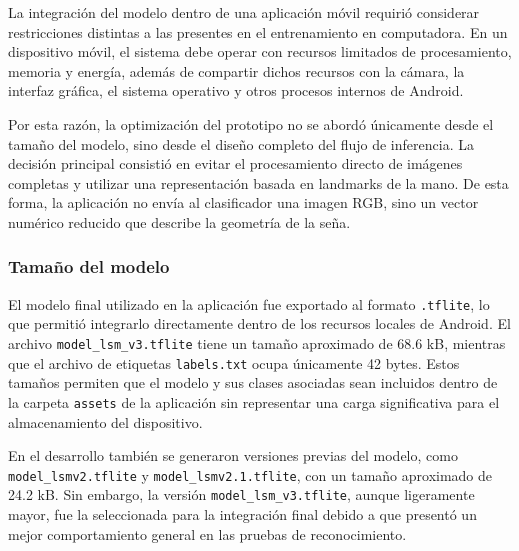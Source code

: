 	La integración del modelo dentro de una aplicación móvil requirió considerar restricciones distintas a las presentes en el entrenamiento en computadora. En un dispositivo móvil, el sistema debe operar con recursos limitados de procesamiento, memoria y energía, además de compartir dichos recursos con la cámara, la interfaz gráfica, el sistema operativo y otros procesos internos de Android.
	
	Por esta razón, la optimización del prototipo no se abordó únicamente desde el tamaño del modelo, sino desde el diseño completo del flujo de inferencia. La decisión principal consistió en evitar el procesamiento directo de imágenes completas y utilizar una representación basada en landmarks de la mano. De esta forma, la aplicación no envía al clasificador una imagen RGB, sino un vector numérico reducido que describe la geometría de la seña.
	
	\subsubsection{Tamaño del modelo}
	
	El modelo final utilizado en la aplicación fue exportado al formato \texttt{.tflite}, lo que permitió integrarlo directamente dentro de los recursos locales de Android. El archivo \texttt{model\_lsm\_v3.tflite} tiene un tamaño aproximado de 68.6 kB, mientras que el archivo de etiquetas \texttt{labels.txt} ocupa únicamente 42 bytes. Estos tamaños permiten que el modelo y sus clases asociadas sean incluidos dentro de la carpeta \texttt{assets} de la aplicación sin representar una carga significativa para el almacenamiento del dispositivo.
	
	En el desarrollo también se generaron versiones previas del modelo, como \texttt{model\_lsmv2.tflite} y \texttt{model\_lsmv2.1.tflite}, con un tamaño aproximado de 24.2 kB. Sin embargo, la versión \texttt{model\_lsm\_v3.tflite}, aunque ligeramente mayor, fue la seleccionada para la integración final debido a que presentó un mejor comportamiento general en las pruebas de reconocimiento.
	
